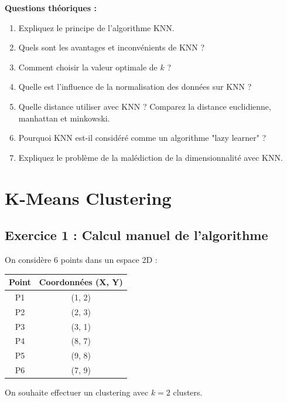 \documentclass[11pt,a4paper]{article}
\begin{document}
\begin{questionbox}
\textbf{Questions théoriques :}
\begin{enumerate}
    \item Expliquez le principe de l'algorithme KNN.
    
    \item Quels sont les avantages et inconvénients de KNN ?
    
    \item Comment choisir la valeur optimale de $k$ ?
    
    \item Quelle est l'influence de la normalisation des données sur KNN ?
    
    \item Quelle distance utiliser avec KNN ? Comparez la distance euclidienne, manhattan et minkowski.
    
    \item Pourquoi KNN est-il considéré comme un algorithme "lazy learner" ?
    
    \item Expliquez le problème de la malédiction de la dimensionnalité avec KNN.
\end{enumerate}
\end{questionbox}

\newpage


\section{K-Means Clustering}

\subsection{Exercice 1 : Calcul manuel de l'algorithme}

\begin{databox}
On considère 6 points dans un espace 2D :

\begin{center}
\begin{tabular}{|c|c|}
\hline
\textbf{Point} & \textbf{Coordonnées (X, Y)} \\
\hline
P1 & (1, 2) \\
P2 & (2, 3) \\
P3 & (3, 1) \\
P4 & (8, 7) \\
P5 & (9, 8) \\
P6 & (7, 9) \\
\hline
\end{tabular}
\end{center}

On souhaite effectuer un clustering avec $k=2$ clusters.
\end{databox}
\end{document}
